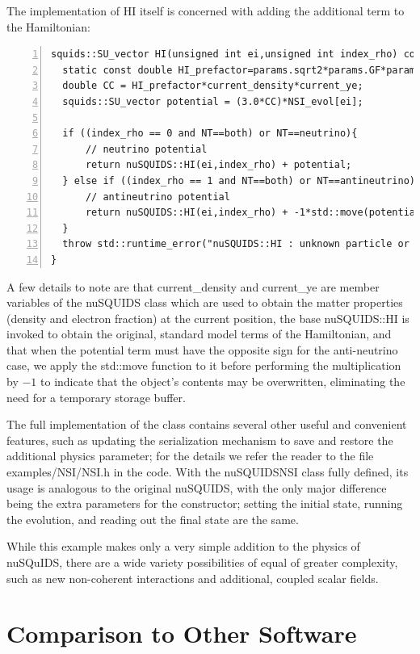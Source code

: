 \documentclass[3p,12pt]{elsarticle}
\newcommand{\ttf}{\ttfamily}
\begin{document}
The implementation of {\ttf HI} itself is concerned with adding the additional term to the Hamiltonian:
\begin{lstlisting}[frame=leftline, numbers=left, breaklines=true, firstnumber=last]
squids::SU_vector HI(unsigned int ei,unsigned int index_rho) const{
  static const double HI_prefactor=params.sqrt2*params.GF*params.Na*pow(params.cm,-3);
  double CC = HI_prefactor*current_density*current_ye;
  squids::SU_vector potential = (3.0*CC)*NSI_evol[ei];

  if ((index_rho == 0 and NT==both) or NT==neutrino){
      // neutrino potential
      return nuSQUIDS::HI(ei,index_rho) + potential;
  } else if ((index_rho == 1 and NT==both) or NT==antineutrino){
      // antineutrino potential
      return nuSQUIDS::HI(ei,index_rho) + -1*std::move(potential);
  }
  throw std::runtime_error("nuSQUIDS::HI : unknown particle or antiparticle");
}
\end{lstlisting}
A few details to note are that {\ttf current\_density} and {\ttf current\_ye} are member variables of the {\ttf nuSQUIDS} class which are used to obtain the matter properties (density and electron fraction) at the current position, the base {\ttf nuSQUIDS::HI} is invoked to obtain the original, standard model terms of the Hamiltonian, and that when the potential term must have the opposite sign for the anti-neutrino case, we apply the {\ttf std::move} function to it before performing the multiplication by $-1$ to indicate that the object's contents may be overwritten, eliminating the need for a temporary storage buffer. 

The full implementation of the class contains several other useful and convenient features, such as updating the serialization mechanism to save and restore the additional physics parameter; for the details we refer the reader to the file {\ttf examples/NSI/NSI.h} in the code. 
With the {\ttf nuSQUIDSNSI} class fully defined, its usage is analogous to the original {\ttf nuSQUIDS}, with the only major difference being the extra parameters for the constructor; setting the initial state, running the evolution, and reading out the final state are the same. 

While this example makes only a very simple addition to the physics of {\ttf nuSQuIDS}, there are a wide variety possibilities of equal of greater complexity, such as new non-coherent interactions and additional, coupled scalar fields. 

\section{Comparison to Other Software}
\label{sec:comparison}
\end{document}
